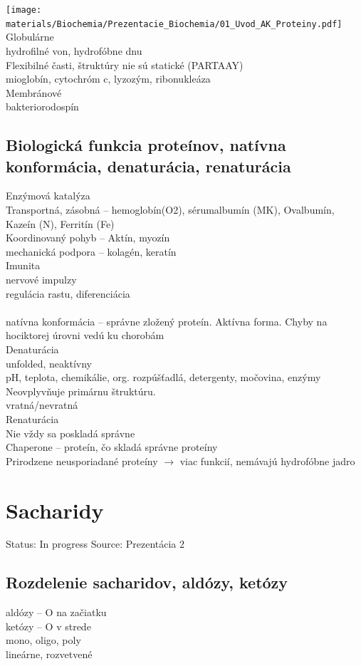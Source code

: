 \texttt{[image: materials/Biochemia/Prezentacie\_Biochemia/01\_Uvod\_AK\_Proteiny.pdf]}
\\
Globulárne\\
\tab hydrofilné von, hydrofóbne dnu\\
\tab Flexibilné časti, štruktúry nie sú statické (PARTAAY)\\
\tab mioglobín, cytochróm c, lyzozým, ribonukleáza\\
Membránové\\
\tab bakteriorodospín\\
\subsection{Biologická funkcia proteínov, natívna konformácia, denaturácia, renaturácia}
Enzýmová katalýza\\
Transportná, zásobná -- hemoglobín(O2), sérumalbumín (MK), Ovalbumín, Kazeín (N), Ferritín (Fe)\\
Koordinovaný pohyb -- Aktín, myozín\\
mechanická podpora -- kolagén, keratín\\
Imunita\\
nervové impulzy\\
regulácia rastu, diferenciácia\\
\\
natívna konformácia -- správne zložený proteín. Aktívna forma. Chyby na hociktorej úrovni vedú ku chorobám\\
Denaturácia\\
\tab unfolded, neaktívny\\
\tab pH, teplota, chemikálie, org. rozpúšťadlá, detergenty, močovina, enzýmy\\
\tab Neovplyvňuje primárnu štruktúru.\\
\tab vratná/nevratná\\
Renaturácia\\
\tab Nie vždy sa poskladá správne\\
Chaperone -- proteín, čo skladá správne proteíny\\
Prirodzene neusporiadané proteíny $\rightarrow$ viac funkcií, nemávajú hydrofóbne jadro

\section{Sacharidy}
Status: In progress
Source: Prezentácia 2
\\
\subsection{Rozdelenie sacharidov, aldózy, ketózy}
aldózy -- O na začiatku\\
ketózy -- O v strede\\
mono, oligo, poly\\
lineárne, rozvetvené\\

